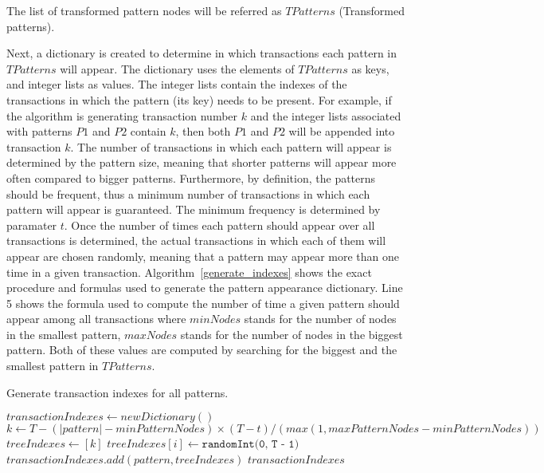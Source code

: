 \documentclass{acm_proc_article-sp-sigmod09}
\begin{document}
The list of transformed pattern nodes will be referred as $TPatterns$ (Transformed patterns).

Next, a dictionary is created to determine in which transactions each pattern in $TPatterns$ will appear. The dictionary uses the elements of $TPatterns$ as keys, and integer lists as values. The integer lists contain the indexes of the transactions in which the pattern (its key) needs to be present. For example, if the algorithm is generating transaction number $k$ and the integer lists associated with patterns $P1$ and $P2$ contain $k$, then both $P1$ and $P2$ will be appended into transaction $k$. The number of transactions in which each pattern will appear is determined by the pattern size, meaning that shorter patterns will appear more often compared to bigger patterns. Furthermore, by definition, the patterns should be frequent, thus a minimum number of transactions in which each pattern will appear is guaranteed. The minimum frequency is determined by paramater $t$. Once the number of times each pattern should appear over all transactions is determined, the actual transactions in which each of them will appear are chosen randomly, meaning that a pattern may appear more than one time in a given transaction. Algorithm~\ref{generate_indexes} shows the exact procedure and formulas used to generate the pattern appearance dictionary. Line 5 shows the formula used to compute the number of time a given pattern should appear among all transactions where $minNodes$ stands for the number of nodes in the smallest pattern, $maxNodes$ stands for the number of nodes in the biggest pattern. Both of these values are computed by searching for the biggest and the smallest pattern in $TPatterns$.
\begin{algorithm}
\caption{Generate transaction indexes for all patterns.}
\label{generate_indexes}
\begin{algorithmic}[1]
\State $transactionIndexes \gets new Dictionary()$
	\State $k \gets T - (|pattern| - minPatternNodes) \times (T - t) / (max(1, maxPatternNodes - minPatternNodes))$
	\State $treeIndexes \gets [k]$
		\State $treeIndexes[i] \gets \texttt{randomInt(0, T - 1)}$
	\EndFor
	\State $transactionIndexes.add(pattern, treeIndexes)$
\EndFor
\Return $transactionIndexes$
\EndFunction
\end{algorithmic}
\end{algorithm}
\end{document}
